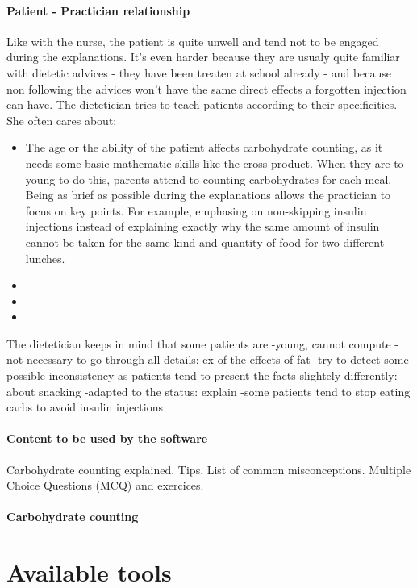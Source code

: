 \paragraph{Patient - Practician %
relationship}
Like with the nurse, the patient is quite unwell and tend not to be engaged %
during the explanations. It's even harder because they are usualy quite familiar with dietetic advices - they have been treaten at school already - and because non following the advices won't have the same direct effects a forgotten injection can have. The dietetician tries to teach patients according to their specificities. She often cares about:
\begin{itemize}
\item The age or the ability of the patient affects carbohydrate counting, as it needs some basic mathematic skills like the cross product. When they are to young to do this, parents attend to counting carbohydrates for each meal. Being as brief as possible during the explanations allows the practician to focus on key points. For example, emphasing on non-skipping insulin injections instead of explaining exactly why the same amount of insulin cannot be taken for the same kind and quantity of food for two different lunches.
\item 
\item 
\item 
\end{itemize}

The dietetician keeps in mind that some patients are
-young, cannot compute
-not necessary to go through all details: ex of the effects of fat
-try to detect some possible inconsistency as patients tend to present the facts slightely differently: about snacking
-adapted to the status: explain 
-some patients tend to stop eating carbs to avoid insulin injections
\paragraph{Content to be used by the software}
Carbohydrate counting explained. Tips. List of common misconceptions. Multiple Choice Questions (MCQ) and exercices. 
\paragraph{Carbohydrate counting}

\section{Available tools}

